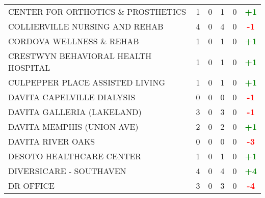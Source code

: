 \documentclass{article}
\begin{document}
\begin{longtable}{l|cccc|c}
    
        CENTER FOR ORTHOTICS \& PROSTHETICS & 1 & 0 & 1 & 0 & \textcolor{green}{\textbf{+1}} \\
    

    
        COLLIERVILLE NURSING AND REHAB & 4 & 0 & 4 & 0 & \textcolor{red}{\textbf{-1}} \\
    

    
        CORDOVA WELLNESS \& REHAB & 1 & 0 & 1 & 0 & \textcolor{green}{\textbf{+1}} \\
    

    
        CRESTWYN BEHAVIORAL HEALTH HOSPITAL & 1 & 0 & 1 & 0 & \textcolor{green}{\textbf{+1}} \\
    

    
        CULPEPPER PLACE ASSISTED LIVING & 1 & 0 & 1 & 0 & \textcolor{green}{\textbf{+1}} \\
    

    
        DAVITA CAPELVILLE DIALYSIS & 0 & 0 & 0 & 0 & \textcolor{red}{\textbf{-1}} \\
    

    
        DAVITA GALLERIA (LAKELAND) & 3 & 0 & 3 & 0 & \textcolor{red}{\textbf{-1}} \\
    

    
        DAVITA MEMPHIS (UNION AVE) & 2 & 0 & 2 & 0 & \textcolor{green}{\textbf{+1}} \\
    

    
        DAVITA RIVER OAKS & 0 & 0 & 0 & 0 & \textcolor{red}{\textbf{-3}} \\
    

    
        DESOTO HEALTHCARE CENTER & 1 & 0 & 1 & 0 & \textcolor{green}{\textbf{+1}} \\
    

    
        DIVERSICARE - SOUTHAVEN & 4 & 0 & 4 & 0 & \textcolor{green}{\textbf{+4}} \\
    

    
        DR OFFICE & 3 & 0 & 3 & 0 & \textcolor{red}{\textbf{-4}} \\
    


\end{longtable}
\end{document}
